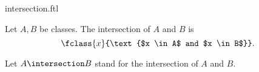 \documentclass{article}
\begin{document}
\begin{smodule}[creators={Marcel Schütz}]{intersection.ftl}


  \begin{fdefinition*}[label=5744033011859456]
    Let $A, B$ be classes.
    The intersection of $A$ and $B$ is
    \[\fclass{x}{\text{$x \in A$ and $x \in B$}}.\]
  \end{fdefinition*}

  \begin{fconvention*}
    Let $A \intersection B$ stand for the intersection of $A$ and $B$.
  \end{fconvention*}
\end{smodule}
\end{document}
